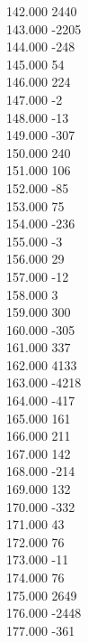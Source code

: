 { 142.000	2440 \\
 143.000	-2205 \\
 144.000	-248 \\
 145.000	54 \\
 146.000	224 \\
 147.000	-2 \\
 148.000	-13 \\
 149.000	-307 \\
 150.000	240 \\
 151.000	106 \\
 152.000	-85 \\
 153.000	75 \\
 154.000	-236 \\
 155.000	-3 \\
 156.000	29 \\
 157.000	-12 \\
 158.000	3 \\
 159.000	300 \\
 160.000	-305 \\
 161.000	337 \\
 162.000	4133 \\
 163.000	-4218 \\
 164.000	-417 \\
 165.000	161 \\
 166.000	211 \\
 167.000	142 \\
 168.000	-214 \\
 169.000	132 \\
 170.000	-332 \\
 171.000	43 \\
 172.000	76 \\
 173.000	-11 \\
 174.000	76 \\
 175.000	2649 \\
 176.000	-2448 \\
 177.000	-361 \\
}
